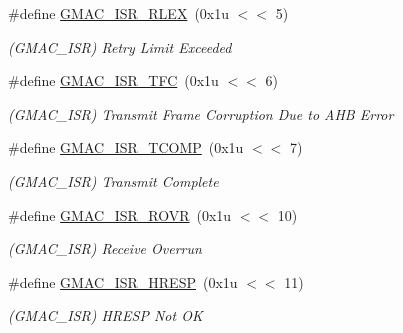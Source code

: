 \begin{DoxyCompactItemize}
\mbox{\label{group__SAMV71__GMAC_gaac419db37253ffbfe888d1216539c54f}} 
\#define \mbox{\hyperlink{group__SAMV71__GMAC_gaac419db37253ffbfe888d1216539c54f}{G\+M\+A\+C\+\_\+\+I\+S\+R\+\_\+\+R\+L\+EX}}~(0x1u $<$$<$ 5)
\begin{DoxyCompactList}\small\item\em (G\+M\+A\+C\+\_\+\+I\+SR) Retry Limit Exceeded \end{DoxyCompactList}\item 
\mbox{\label{group__SAMV71__GMAC_ga67779dcadc46634f3931f53a58b5a00c}} 
\#define \mbox{\hyperlink{group__SAMV71__GMAC_ga67779dcadc46634f3931f53a58b5a00c}{G\+M\+A\+C\+\_\+\+I\+S\+R\+\_\+\+T\+FC}}~(0x1u $<$$<$ 6)
\begin{DoxyCompactList}\small\item\em (G\+M\+A\+C\+\_\+\+I\+SR) Transmit Frame Corruption Due to A\+HB Error \end{DoxyCompactList}\item 
\mbox{\label{group__SAMV71__GMAC_gab3b94f755dfbef73b55a5f7ff8ce4604}} 
\#define \mbox{\hyperlink{group__SAMV71__GMAC_gab3b94f755dfbef73b55a5f7ff8ce4604}{G\+M\+A\+C\+\_\+\+I\+S\+R\+\_\+\+T\+C\+O\+MP}}~(0x1u $<$$<$ 7)
\begin{DoxyCompactList}\small\item\em (G\+M\+A\+C\+\_\+\+I\+SR) Transmit Complete \end{DoxyCompactList}\item 
\mbox{\label{group__SAMV71__GMAC_ga07564af3de1886ce661d327a0fd8bd03}} 
\#define \mbox{\hyperlink{group__SAMV71__GMAC_ga07564af3de1886ce661d327a0fd8bd03}{G\+M\+A\+C\+\_\+\+I\+S\+R\+\_\+\+R\+O\+VR}}~(0x1u $<$$<$ 10)
\begin{DoxyCompactList}\small\item\em (G\+M\+A\+C\+\_\+\+I\+SR) Receive Overrun \end{DoxyCompactList}\item 
\mbox{\label{group__SAMV71__GMAC_ga24c8298ef226ae0f7f1c854905648273}} 
\#define \mbox{\hyperlink{group__SAMV71__GMAC_ga24c8298ef226ae0f7f1c854905648273}{G\+M\+A\+C\+\_\+\+I\+S\+R\+\_\+\+H\+R\+E\+SP}}~(0x1u $<$$<$ 11)
\begin{DoxyCompactList}\small\item\em (G\+M\+A\+C\+\_\+\+I\+SR) H\+R\+E\+SP Not OK \end{DoxyCompactList}\item 
$$
\end{DoxyCompactItemize}
